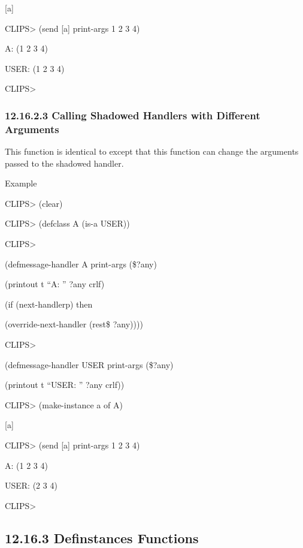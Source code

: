 \documentclass[letterpaper,10pt,english]{sphinxmanual}
\begin{document}
{[}a{]}

CLIPS\textgreater{} (send {[}a{]} print-args 1 2 3 4)

A: (1 2 3 4)

USER: (1 2 3 4)

CLIPS\textgreater{}


\subsubsection{12.16.2.3 Calling Shadowed Handlers with Different Arguments}
\label{\detokenize{actions:calling-shadowed-handlers-with-different-arguments}}
This function is identical to  except that this
function can change the arguments passed to the shadowed handler.


\begin{sphinxVerbatim}[commandchars=\\\{\}]
 
\end{sphinxVerbatim}

Example

CLIPS\textgreater{} (clear)

CLIPS\textgreater{} (defclass A (is-a USER))

CLIPS\textgreater{}

(defmessage-handler A print-args (\$?any)

(printout t “A: ” ?any crlf)

(if (next-handlerp) then

(override-next-handler (rest\$ ?any))))

CLIPS\textgreater{}

(defmessage-handler USER print-args (\$?any)

(printout t “USER: ” ?any crlf))

CLIPS\textgreater{} (make-instance a of A)

{[}a{]}

CLIPS\textgreater{} (send {[}a{]} print-args 1 2 3 4)

A: (1 2 3 4)

USER: (2 3 4)

CLIPS\textgreater{}


\subsection{12.16.3 Definstances Functions}
\label{\detokenize{actions:definstances-functions}}
\end{document}

